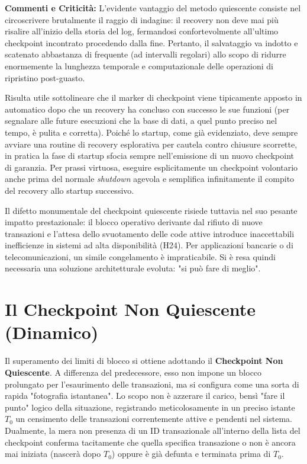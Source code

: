 \textbf{Commenti e Criticità:}
L'evidente vantaggio del metodo quiescente consiste nel circoscrivere brutalmente il raggio di indagine: il recovery non deve mai più risalire all'inizio della storia del log, fermandosi confortevolmente all'ultimo checkpoint incontrato procedendo dalla fine. Pertanto, il salvataggio va indotto e scatenato abbastanza di frequente (ad intervalli regolari) allo scopo di ridurre enormemente la lunghezza temporale e computazionale delle operazioni di ripristino post-guasto.

Risulta utile sottolineare che il marker di checkpoint viene tipicamente apposto in automatico dopo che un recovery ha concluso con successo le sue funzioni (per segnalare alle future esecuzioni che la base di dati, a quel punto preciso nel tempo, è pulita e corretta). Poiché lo startup, come già evidenziato, deve sempre avviare una routine di recovery esplorativa per cautela contro chiusure scorrette, in pratica la fase di startup sfocia sempre nell'emissione di un nuovo checkpoint di garanzia. Per prassi virtuosa, eseguire esplicitamente un checkpoint volontario anche prima del normale \textit{shutdown} agevola e semplifica infinitamente il compito del recovery allo startup successivo.

Il difetto monumentale del checkpoint quiescente risiede tuttavia nel suo pesante impatto prestazionale: il blocco operativo derivante dal rifiuto di nuove transazioni e l'attesa dello svuotamento delle code attive introduce inaccettabili inefficienze in sistemi ad alta disponibilità (H24). Per applicazioni bancarie o di telecomunicazioni, un simile congelamento è impraticabile. Si è resa quindi necessaria una soluzione architetturale evoluta: "si può fare di meglio".

\section{Il Checkpoint Non Quiescente (Dinamico)}

Il superamento dei limiti di blocco si ottiene adottando il \textbf{Checkpoint Non Quiescente}. A differenza del predecessore, esso non impone un blocco prolungato per l'esaurimento delle transazioni, ma si configura come una sorta di rapida "fotografia istantanea". Lo scopo non è azzerare il carico, bensì "fare il punto" logico della situazione, registrando meticolosamente in un preciso istante $T_0$ un censimento delle transazioni correntemente attive e pendenti nel sistema. Dualmente, la mera non presenza di un ID transazionale all'interno della lista del checkpoint conferma tacitamente che quella specifica transazione o non è ancora mai iniziata (nascerà dopo $T_0$) oppure è già defunta e terminata prima di $T_0$.

